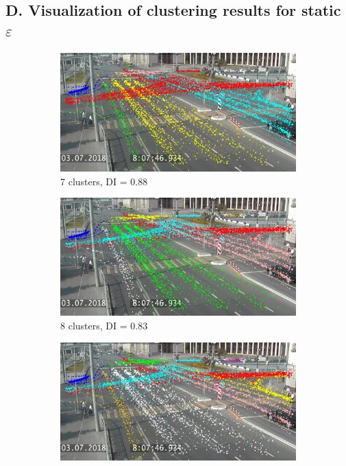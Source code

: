 \subsection*{D. Visualization of clustering results for static $\varepsilon$}
\begin{figure}[!htb]
	\centering
	\begin{subfigure}[!htb]{0.495\textwidth}
		\centering{}
		\includegraphics[width=\textwidth]{images/cl-res/1-7cl-01.png}
		\caption{7 clusters, DI = 0.88}
		\label{fig:1-7cl-01}
	\end{subfigure}
	\hfill
	\begin{subfigure}[!htb]{0.495\textwidth}
		\centering{}
		\includegraphics[width=\textwidth]{images/cl-res/1-8cl-01.png}
		\caption{8 clusters, DI = 0.83}
		\label{fig:1-8cl-01}
	\end{subfigure}
	\hfill
	\begin{subfigure}[!htb]{0.495\textwidth}
		\centering{}
		\includegraphics[width=\textwidth]{images/cl-res/1-9cl-01.png}

\end{subfigure}
\end{figure}
